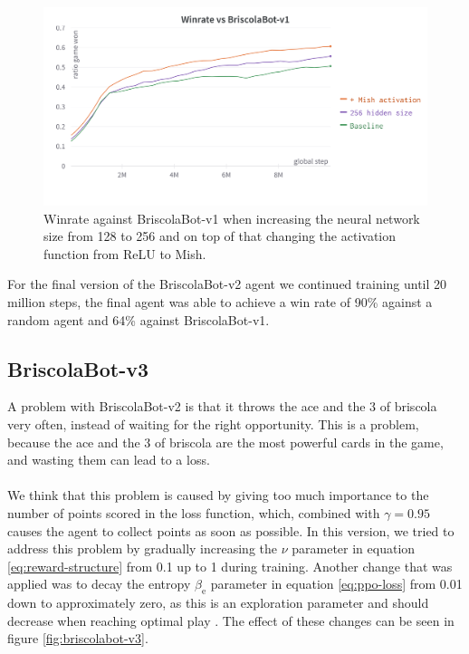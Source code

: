 \begin{figure}[H]
    \centering
    \includegraphics[width=\textwidth]{images/mish-activation.png}
    \caption{Winrate against BriscolaBot-v1 when increasing the neural network size from 128 to 256 and on top of that changing the activation function from ReLU to Mish.}
    \label{fig:mish-activation}
\end{figure}

For the final version of the BriscolaBot-v2 agent we continued training until 20 million steps, the final agent was able to achieve a win rate of 90\% against a random agent and 64\% against BriscolaBot-v1.

\subsection{BriscolaBot-v3}
A problem with BriscolaBot-v2 is that it throws the ace and the 3 of briscola very often, instead of waiting for the right opportunity. This is a problem, because the ace and the 3 of briscola are the most powerful cards in the game, and wasting them can lead to a loss.\\\\
We think that this problem is caused by giving too much importance to the number of points scored in the loss function, which, combined with $\gamma = 0.95$ causes the agent to collect points as soon as possible. In this version, we tried to address this problem by gradually increasing the $\nu$ parameter in equation \eqref{eq:reward-structure} from 0.1 up to 1 during training. Another change that was applied was to decay the entropy $\beta_\textrm{e}$ parameter in equation \eqref{eq:ppo-loss} from 0.01 down to approximately zero, as this is an exploration parameter and should decrease when reaching optimal play \cite{open-ai-five}. The effect of these changes can be seen in figure \ref{fig:briscolabot-v3}.

